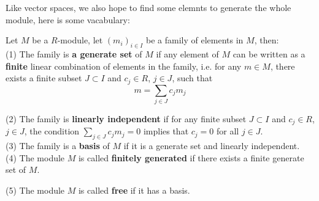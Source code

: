 \documentclass[12pt,a4paper]{article}
\begin{document}
Like vector spaces, we also hope to find some elemnts to generate the whole module, here is some vacabulary:
\begin{definitionplain}
    Let \(M\) be a \(R\)-module, let \((m_i)_{i \in I}\) be a family of elements in \(M\), then:\\

    (1) The family is \textbf{a generate set} of \(M\) if any element of \(M\) can be written as a \textbf{finite} linear combination of elements in the family, i.e. for any \(m \in M\), there exists a finite subset \(J \subset I\) and \(c_j \in R\), \(j \in J\), such that
    \[m = \sum_{j \in J} c_j m_j\]

    (2) The family is \textbf{linearly independent} if for any finite subset \(J \subset I\) and \(c_j \in R\), \(j \in J\), the condition \(\sum_{j \in J} c_j m_j = 0\) implies that \(c_j = 0\) for all \(j \in J\).\\

    (3) The family is a \textbf{basis} of \(M\) if it is a generate set and linearly independent.\\

    (4) The module \(M\) is called \textbf{finitely generated} if there exists a finite generate set of \(M\).

    (5) The module \(M\) is called \textbf{free} if it has a basis.
\end{definitionplain}
\end{document}
